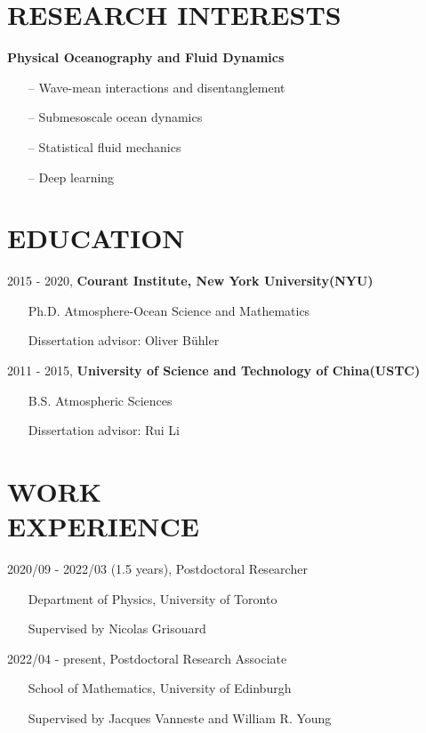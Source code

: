 \documentclass[margin]{res}
\begin{document}
\begin{resume}

\section{{\normalfont RESEARCH INTERESTS}}
\textbf{Physical Oceanography and Fluid Dynamics}
\begin{itemize}[leftmargin=*,noitemsep]
\item[--]{Wave-mean interactions and disentanglement}
\item[--]{Submesoscale ocean dynamics}
\item[--]{Statistical fluid mechanics}
\item[--]{Deep learning}
\end{itemize}

\section{{\normalfont EDUCATION}}
2015 - 2020, \textbf{Courant Institute, New York University(NYU)} 
\begin{itemize}[leftmargin=*,noitemsep]
\item[]{Ph.D. Atmosphere-Ocean Science and Mathematics}
\item[]{Dissertation advisor: Oliver B{\"u}hler}
\end{itemize}
\vspace*{-2.5mm}
2011 - 2015, \textbf{University of Science and Technology of China(USTC)} 
\begin{itemize}[leftmargin=*,noitemsep]
\item[]{B.S. Atmospheric Sciences}
\item[]{Dissertation advisor: Rui Li}
\end{itemize}

\section{{\normalfont WORK \\EXPERIENCE}}
2020/09 - 2022/03 (1.5 years), Postdoctoral Researcher
\begin{itemize}[leftmargin=*,noitemsep]
\item[]{Department of Physics, University of Toronto}
\item[]{Supervised by Nicolas Grisouard}
\end{itemize}
2022/04 - present, Postdoctoral Research Associate
\begin{itemize}[leftmargin=*,noitemsep]
\item[]{School of Mathematics, University of Edinburgh}
\item[]{Supervised by  Jacques Vanneste and William R. Young }
\end{itemize}


\end{resume}
\end{document}
